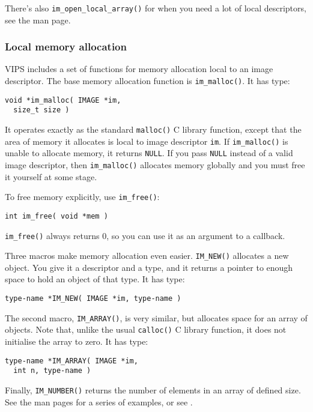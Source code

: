 There's also \verb+im_open_local_array()+ for when you need a lot of local
descriptors, see the man page.

\subsubsection{Local memory allocation}
\label{sec:malloc}

VIPS includes a set of functions for memory allocation local to an image
descriptor. The base memory allocation function is \verb+im_malloc()+. It
has type:

\begin{verbatim}
void *im_malloc( IMAGE *im, 
  size_t size )
\end{verbatim}

It operates exactly as the standard \verb+malloc()+ C library function,
except that the area of memory it allocates is local to image descriptor
\verb+im+. If \verb+im_malloc()+ is unable to allocate memory, it returns
\verb+NULL+. If you pass \verb+NULL+ instead of a valid image descriptor,
then \verb+im_malloc()+ allocates memory globally and you must free it
yourself at some stage.

To free memory explicitly, use \verb+im_free()+:

\begin{verbatim}
int im_free( void *mem )
\end{verbatim}

\noindent
\verb+im_free()+ always returns 0, so you can use it as an argument to a
callback.

Three macros make memory allocation even easier. \verb+IM_NEW()+ allocates
a new object. You give it a descriptor and a type, and it returns a pointer
to enough space to hold an object of that type. It has type:

\begin{verbatim}
type-name *IM_NEW( IMAGE *im, type-name )
\end{verbatim}

The second macro, \verb+IM_ARRAY()+, is very similar, but allocates
space for an array of objects. Note that, unlike the usual \verb+calloc()+
C library function, it does not initialise the array to zero. It has type:

\begin{verbatim}
type-name *IM_ARRAY( IMAGE *im, 
  int n, type-name )
\end{verbatim}

Finally, \verb+IM_NUMBER()+ returns the number of elements in an array of
defined size.  See the man pages for a series of examples, or
see .

